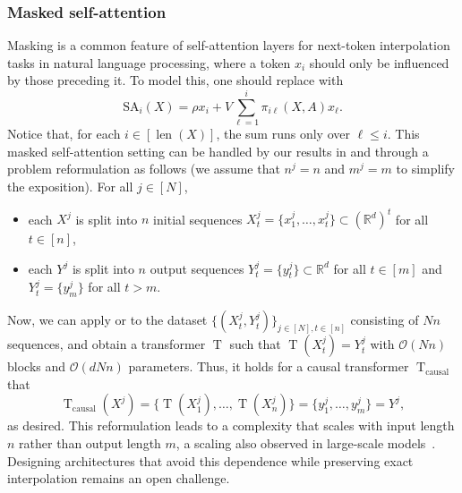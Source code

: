 \documentclass[pdflatex,sn-mathphys-num]{sn-jnl}%
\theoremstyle{thmstyleone}%
\theoremstyle{thmstyletwo}%
\theoremstyle{thmstylethree}%
\numberwithin{equation}{section}
\newcommand{\R}{\mathbb{R}}
\DeclareMathOperator{\T}{\mathrm{T}}
\DeclareMathOperator{\len}{len}
\begin{document}
\subsubsection{Masked self-attention}\label{sss:maskedSA}

Masking is a common feature of self-attention layers for next-token interpolation tasks in natural language processing, where a token $x_i$ should only be influenced by those preceding it. To model this, one should replace  with
$$
    \mathrm{SA}_i(X) = \rho x_i + V \sum_{\ell = 1}^i \pi_{i\ell}(X,A)x_\ell.
$$
Notice that, for each $i\in [\len (X)]$, the sum runs only over $\ell \leq i$. This masked self-attention setting can be handled by our results in  and  through a problem reformulation as follows (we assume that $n^j = n$ and $m^j = m$ to simplify the exposition). For all $j\in [N]$, 
\begin{itemize}
    \item each $X^j$ is split into $n$ initial sequences $ X_t^j = \{ x_1^j, \dots, x_t^j \} \subset (\R^d)^t$ for all $t\in [n]$,
    \item each $Y^j$ is split into $n$ output sequences $ Y_t^j = \{ y_t^j \} \subset \R^d$ for all $t\in [m]$ and $Y_t^j = \{ y_m^j\}$ for all $t > m$.
\end{itemize}
Now, we can apply  or  to the dataset $\{(X_t^j, Y_t^j)\}_{j\in [N], t\in [n]}$ consisting of $N n$ sequences, and obtain a transformer $\T$ such that $\T (X^j_t) = Y^j_t$ with $\mathcal{O}(Nn)$ blocks and $\mathcal{O}(d N n)$ parameters. Thus, it holds for a causal transformer $\T_\text{causal}$ that
$$
\T_\text{causal} (X^j) = \{ \T(X_1^j),  \dots, \T(X_n^j) \} = \{ y_1^j,  \dots,  y_m^j \} = Y^j,
$$
as desired. This reformulation leads to a complexity that scales with input length $n$ rather than output length $m$, a scaling also observed in large-scale models~\cite{hoffmann2022training}. Designing architectures that avoid this dependence while preserving exact interpolation remains an open challenge.




\end{document}
